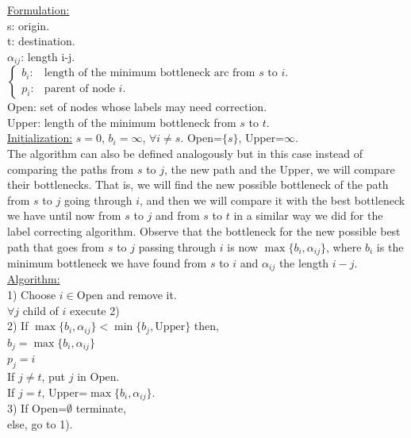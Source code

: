\documentclass[11pt, english]{article}
\begin{document}
\underline{Formulation:}\\
s: origin.\\
t: destination.\\
$\alpha_{ij}$: length i-j.\\
$\left\{\begin{array}{ll}
b_i: & \text{length of the minimum bottleneck arc from }s\text{ to }i.\\
p_i: & \text{parent of node }i.
\end{array}\right.$\\
Open: set of nodes whose labels may need correction.\\
Upper: length of the minimum bottleneck from $s$ to $t$.\\ 

\underline{Initialization:}
$s=0$, $b_i=\infty$, $\forall i\neq s$. Open=$\{s\}$, Upper=$\infty$.\\

The algorithm can also be defined analogously but in this case instead of comparing the paths from $s$ to $j$, the new path and the Upper, we will compare their bottlenecks. That is, we will find the new possible bottleneck of the path from $s$ to $j$ going through $i$, and then we will compare it with the best bottleneck we have until now from $s$ to $j$ and from $s$ to $t$ in a similar way we did for the label correcting algorithm. Observe that the bottleneck for the new possible best path that goes from $s$ to $j$ passing through $i$ is now $\max\{b_i,\alpha_{ij}\}$, where $b_i$ is the minimum bottleneck we have found from $s$ to $i$ and $\alpha_{ij}$ the length $i-j$.  \\

\underline{Algorithm:}\\
1) Choose $i\in$Open and remove it. \\
$\forall j$ child of $i$ execute 2)\\

2) If $\max\{b_i,\alpha_{ij}\}<\min\{b_j,\text{Upper}\}$ then, \\
$b_j=\max\{b_i,\alpha_{ij}\}$\\
$p_j=i$\\
If $j\neq t$, put $j$ in Open.\\
If $j=t$, Upper=$\max\{b_i,\alpha_{ij}\}$.\\

3) If Open=$\emptyset$ terminate,\\ 
else, go to 1).\\
\end{document}
